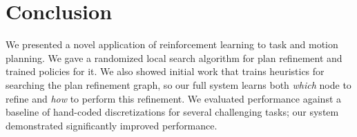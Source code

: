 \section{Conclusion}
We presented a novel application of reinforcement learning to task
and motion planning. We gave a randomized local search algorithm for plan refinement
and trained policies for it. We also showed initial work that trains heuristics
for searching the plan refinement graph, so our full system learns both \emph{which} node to refine
and \emph{how} to perform this refinement. We evaluated performance against a baseline
of hand-coded discretizations for several challenging tasks; our system demonstrated
significantly improved performance.
